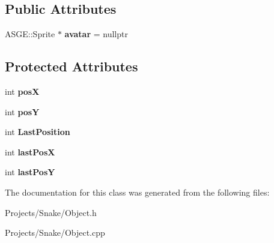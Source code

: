 \subsection*{Public Attributes}
\begin{DoxyCompactItemize}
\item 
\mbox{\label{class_object_a8ea71e8524ce41f48e9306d057857343}} 
A\+S\+G\+E\+::\+Sprite $\ast$ {\bfseries avatar} = nullptr
\end{DoxyCompactItemize}
\subsection*{Protected Attributes}
\begin{DoxyCompactItemize}
\item 
\mbox{\label{class_object_a7ee7b52ed8eae9689f421ff684bbb047}} 
int {\bfseries posX}
\item 
\mbox{\label{class_object_a022d84d29a80ab6576af10c9e04c8f16}} 
int {\bfseries posY}
\item 
\mbox{\label{class_object_abf717e319b3b15409a0bbfc5bec71fbd}} 
int {\bfseries Last\+Position}
\item 
\mbox{\label{class_object_a822da9ea7163e8bbcc258e266858e8bf}} 
int {\bfseries last\+PosX}
\item 
\mbox{\label{class_object_a0a8f5d95cd0a6239031519469a03c5d4}} 
int {\bfseries last\+PosY}
\end{DoxyCompactItemize}


The documentation for this class was generated from the following files\+:\begin{DoxyCompactItemize}
\item 
Projects/\+Snake/Object.\+h\item 
Projects/\+Snake/Object.\+cpp\end{DoxyCompactItemize}
